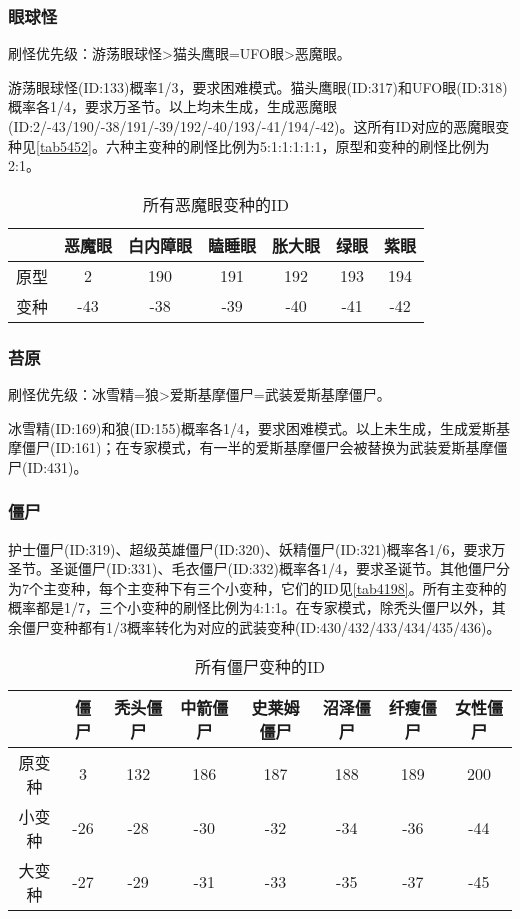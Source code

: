 \subsubsection{眼球怪}\label{app15}
刷怪优先级：游荡眼球怪>猫头鹰眼=UFO眼>恶魔眼。

游荡眼球怪(ID:133)概率1/3，要求困难模式。猫头鹰眼(ID:317)和UFO眼(ID:318)概率各1/4，要求万圣节。以上均未生成，生成恶魔眼(ID:2/-43/190/-38/191/-39/192/-40/193/-41/194/-42)。这所有ID对应的恶魔眼变种见\autoref{tab5452}。六种主变种的刷怪比例为5:1:1:1:1:1，原型和变种的刷怪比例为2:1。

\begin{table}[!h]
    \centering
    \begin{tabular}{c|cccccc}
         &恶魔眼&白内障眼&瞌睡眼&胀大眼&绿眼&紫眼\\\hline
         原型&2&190&191&192&193&194\\
         变种&-43&-38&-39&-40&-41&-42
    \end{tabular}
    \caption{所有恶魔眼变种的ID}
    \label{tab5452}
\end{table}

\subsubsection{苔原}\label{app16}
刷怪优先级：冰雪精=狼>爱斯基摩僵尸=武装爱斯基摩僵尸。

冰雪精(ID:169)和狼(ID:155)概率各1/4，要求困难模式。以上未生成，生成爱斯基摩僵尸(ID:161)；在专家模式，有一半的爱斯基摩僵尸会被替换为武装爱斯基摩僵尸(ID:431)。

\subsubsection{僵尸}\label{app17}
护士僵尸(ID:319)、超级英雄僵尸(ID:320)、妖精僵尸(ID:321)概率各1/6，要求万圣节。圣诞僵尸(ID:331)、毛衣僵尸(ID:332)概率各1/4，要求圣诞节。其他僵尸分为7个主变种，每个主变种下有三个小变种，它们的ID见\autoref{tab4198}。所有主变种的概率都是1/7，三个小变种的刷怪比例为4:1:1。在专家模式，除秃头僵尸以外，其余僵尸变种都有1/3概率转化为对应的武装变种(ID:430/432/433/434/435/436)。

\begin{table}[!h]
    \centering
    \begin{tabular}{c|ccccccc}
         &僵尸&秃头僵尸&中箭僵尸&史莱姆僵尸&沼泽僵尸&纤瘦僵尸&女性僵尸\\\hline
         原变种&3  &132&186&187&188&189&200\\
         小变种&-26&-28&-30&-32&-34&-36&-44\\
         大变种&-27&-29&-31&-33&-35&-37&-45
    \end{tabular}
    \caption{所有僵尸变种的ID}
    \label{tab4198}
\end{table}

